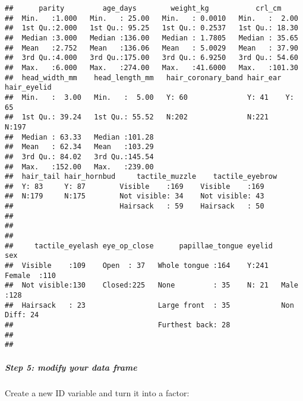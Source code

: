 \documentclass[
]{article}
\newenvironment{Shaded}{\begin{snugshade}}{\end{snugshade}}
\newcommand{\DataTypeTok}[1]{\textcolor[rgb]{0.13,0.29,0.53}{#1}}
\newcommand{\KeywordTok}[1]{\textcolor[rgb]{0.13,0.29,0.53}{\textbf{#1}}}
\newcommand{\NormalTok}[1]{#1}
\newcommand{\OperatorTok}[1]{\textcolor[rgb]{0.81,0.36,0.00}{\textbf{#1}}}
\newcommand{\StringTok}[1]{\textcolor[rgb]{0.31,0.60,0.02}{#1}}
\begin{document}
\begin{verbatim}
##      parity         age_days        weight_kg           crl_cm      
##  Min.   :1.000   Min.   : 25.00   Min.   : 0.0010   Min.   :  2.00  
##  1st Qu.:2.000   1st Qu.: 95.25   1st Qu.: 0.2537   1st Qu.: 18.30  
##  Median :3.000   Median :136.00   Median : 1.7805   Median : 35.65  
##  Mean   :2.752   Mean   :136.06   Mean   : 5.0029   Mean   : 37.90  
##  3rd Qu.:4.000   3rd Qu.:175.00   3rd Qu.: 6.9250   3rd Qu.: 54.60  
##  Max.   :6.000   Max.   :274.00   Max.   :41.6000   Max.   :101.30  
##  head_width_mm    head_length_mm   hair_coronary_band hair_ear hair_eyelid
##  Min.   :  3.00   Min.   :  5.00   Y: 60              Y: 41    Y: 65      
##  1st Qu.: 39.24   1st Qu.: 55.52   N:202              N:221    N:197      
##  Median : 63.33   Median :101.28                                          
##  Mean   : 62.34   Mean   :103.29                                          
##  3rd Qu.: 84.02   3rd Qu.:145.54                                          
##  Max.   :152.00   Max.   :239.00                                          
##  hair_tail hair_hornbud     tactile_muzzle    tactile_eyebrow
##  Y: 83     Y: 87        Visible    :169    Visible    :169   
##  N:179     N:175        Not visible: 34    Not visible: 43   
##                         Hairsack   : 59    Hairsack   : 50   
##                                                              
##                                                              
##                                                              
##     tactile_eyelash eye_op_close      papillae_tongue eyelid        sex     
##  Visible    :109    Open  : 37   Whole tongue :164    Y:241   Female  :110  
##  Not visible:130    Closed:225   None         : 35    N: 21   Male    :128  
##  Hairsack   : 23                 Large front  : 35            Non Diff: 24  
##                                  Furthest back: 28                          
##                                                                             
## 
\end{verbatim}

\hypertarget{step-5-modify-your-data-frame}{%
\subparagraph{Step 5: modify your data
frame}\label{step-5-modify-your-data-frame}}

Create a new ID variable and turn it into a factor:

\begin{Shaded}
\end{Shaded}
\end{document}
